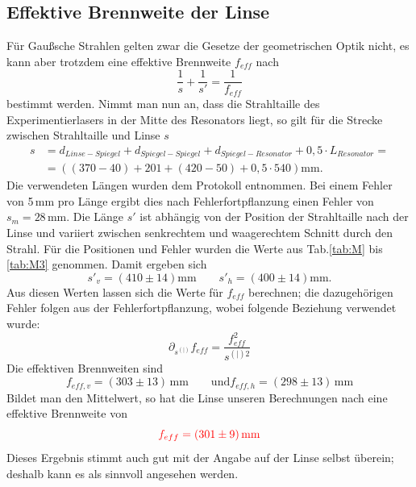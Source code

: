 \subsection{Effektive Brennweite der Linse}
\label{subs:f}
Für Gaußsche Strahlen gelten zwar die Gesetze der geometrischen Optik nicht, es kann aber trotzdem eine effektive Brennweite $f_{eff}$ nach 
\begin{equation*}
    \frac{1}{s} + \frac{1}{s'} = \frac{1}{f_{eff}}
\end{equation*}
bestimmt werden. Nimmt man nun an, dass die Strahltaille des Experimentierlasers in der Mitte des Resonators liegt, so gilt für die Strecke zwischen Strahltaille und 
Linse $s$
\begin{align*}
    s &= d_{Linse-Spiegel} + d_{Spiegel-Spiegel} + d_{Spiegel-Resonator} + 0,5 \cdot L_{Resonator} = \\
    &= ((370 - 40) + 201 + (420-50) + 0,5 \cdot 540)\mathrm{mm}.
\end{align*}
Die verwendeten Längen wurden dem Protokoll entnommen. Bei einem Fehler von 5\,mm pro Länge ergibt dies nach Fehlerfortpflanzung einen Fehler von $s_m = 28$\,mm. 
Die Länge $s'$ ist abhängig von der Position der Strahltaille nach der Linse und variiert zwischen senkrechtem und waagerechtem Schnitt durch den Strahl. Für die 
Positionen und Fehler wurden die Werte aus Tab.\ref{tab:M} bis \ref{tab:M3} genommen. Damit ergeben sich
\begin{equation*}
    s'_v = (410 \pm 14)\mathrm{mm} \qquad s'_h = (400 \pm 14)\mathrm{mm}.
\end{equation*}
Aus diesen Werten lassen sich die Werte für $f_{eff}$ berechnen; die dazugehörigen Fehler folgen aus der Fehlerfortpflanzung, wobei folgende Beziehung verwendet wurde:
\begin{equation*}
    \partial_{s^{(|)}}f_{eff} = \frac{f_{eff}^2}{s^{(|)2}}
\end{equation*}
Die effektiven Brennweiten sind
\begin{equation*}
    f_{eff,v} = (303 \pm 13)\,\mathrm{mm}\qquad\mathrm{und }f_{eff,h}=(298 \pm 13)\,\mathrm{mm}
\end{equation*}
Bildet man den Mittelwert, so hat die Linse unseren Berechnungen nach eine effektive Brennweite von
\begin{equation*}
    \textcolor{red}{f_{eff} = (301 \pm 9)\, \mathrm{mm}}
\end{equation*}
Dieses Ergebnis stimmt auch gut mit der Angabe auf der Linse selbst überein; deshalb kann es als sinnvoll angesehen werden.

